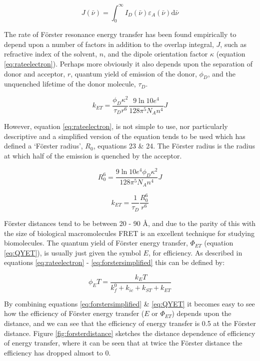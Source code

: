 \documentclass[
]{book}
\begin{document}
\begin{equation}
J (\bar \nu) = \int_0^\infty I_D(\bar \nu)\varepsilon_A(\bar \nu)\textrm{d}\bar \nu
\label{eq:overlap}
\end{equation}

The rate of Förster resonance energy transfer has been found empirically to depend upon a number of factors in addition to the overlap integral, \(J\), such as refractive index of the solvent, \(n\), and the dipole orientation factor \(\kappa\) (equation \eqref{eq:rateelectron}). Perhaps more obviously it also depends upon the separation of donor and acceptor, \(r\), quantum yield of emission of the donor, \(\phi_D\), and the unquenched lifetime of the donor molecule, \(\tau_D\).

\begin{equation}
k_{ET}= \frac{\phi_D \kappa^2}{\tau_D r^6}\frac{9 \ln 10 e^4}{128 \pi^5 N_A n^4}J
\label{eq:rateelectron}
\end{equation}

However, equation \eqref{eq:rateelectron}, is not simple to use, nor particularly descriptive and a simplified version of the equation tends to be used which has defined a `Förster radius', \(R_0\), equations 23 \& 24. The Förster radius is the radius at which half of the emission is quenched by the acceptor.

\begin{equation}
R_0^6=\frac{9 \ln 10 e^4 \phi_D \kappa^2}{128 \pi^5 N_A n^4 }J
\label{eq:forsterdistance}
\end{equation}

\begin{equation}
k_{ET}=\frac{1}{\tau_D}\frac{R_0^6}{r^6}
\label{eq:forstersimplified}
\end{equation}

Förster distances tend to be between 20 - 90 Å, and due to the parity of this with the size of biological macromolecules FRET is an excellent technique for studying biomolecules.
The quantum yield of Förster energy transfer, \(Φ_{ET}\) (equation \eqref{eq:QYET}), is usually just given the symbol \(E\), for efficiency. As described in equations \eqref{eq:rateelectron} - \eqref{eq:forstersimplified} this can be defined by:

\begin{equation}
\phi_ET = \frac{k_ET}{k_f^0+k_{ic}+ k_{ST}+k_{ET}}
\label{eq:QYET}
\end{equation}

By combining equations \eqref{eq:forstersimplified} \& \eqref{eq:QYET} it becomes easy to see how the efficiency of Förster energy transfer (\(E\) or \(Φ_{ET}\)) depends upon the distance, and we can see that the efficiency of energy transfer is 0.5 at the Förster distance. Figure \ref{fig:forsterdistance} sketches the distance dependence of efficiency of energy transfer, where it can be seen that at twice the Förster distance the efficiency has dropped almost to 0.
\end{document}
